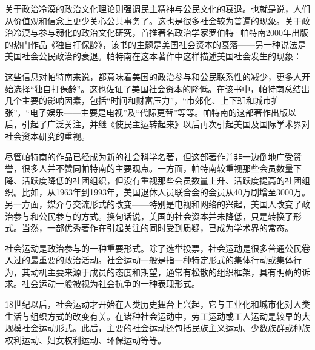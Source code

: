 关于政治冷漠的政治文化理论则强调民主精神与公民文化的衰退。也就是说，人们从价值观和信念上更少关心公共事务了。这也是很多社会较为普遍的现象。关于政治冷漠与参与弱化的政治文化研究，首推著名政治学家罗伯特·帕特南2000年出版的热门作品《独自打保龄》，该书的主题是美国社会资本的衰落——另一种说法是美国社会公民政治的衰退。帕特南在这本著作中这样描述美国社会发生的现象：


这些信息对帕特南来说，都意味着美国的政治参与和公民联系性的减少，更多人开始选择“独自打保龄”。这也佐证了美国社会资本的降低。在该书中，帕特南总结出几个主要的影响因素，包括“时间和财富压力”，“市郊化、上下班和城市扩张”，“电子娱乐——主要是电视”及“代际更替”等等。帕特南的这部著作出版以后，引起了广泛关注，并继《使民主运转起来》以后再次引起美国及国际学术界对社会资本研究的重视。

尽管帕特南的作品已经成为新的社会科学名著，但这部著作并非一边倒地广受赞誉，很多人并不赞同帕特南的主要观点。一方面，帕特南较重视那些会员数量下降、活跃度降低的社团组织，但没有重视那些会员数量上升、活跃度提高的社团组织。比如，从1963年到1993年，美国退休人员联合会的会员从40万剧增至3000万。另一方面，媒介与交流形式的改变——特别是电视和网络的兴起，美国人改变了政治参与和公民参与的方式。换句话说，美国的社会资本并未降低，只是转换了形式。当然，一部优秀著作在引起关注的同时受到质疑，已成为学术界的常态。


社会运动是政治参与的一种重要形式。除了选举投票，社会运动是很多普通公民卷入过的最重要的政治活动。社会运动一般是指一种特定形式的集体行动或集体行为，其动机主要来源于成员的态度和期望，通常有松散的组织框架，具有明确的诉求。社会运动一般被视为社会抗争的一种表现形式。

18世纪以后，社会运动才开始在人类历史舞台上兴起，它与工业化和城市化对人类生活与组织方式的改变有关。在诸种社会运动中，劳工运动或工人运动是较早的大规模社会运动形式。此后，主要的社会运动还包括民族主义运动、少数族群或种族权利运动、妇女权利运动、环保运动等等。

